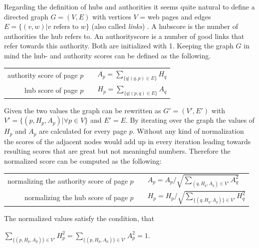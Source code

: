 Regarding the definition of hubs and authorities it seems quite natural to define a directed graph $G=(V,E)$ with vertices $V$ = web pages and edges $E = \{(v,w) | v \textrm{ refers to }w\}$ (also called \emph{links}) .
A hubscore is the number of authorities the hub refers to. An authorityscore is a number of good links that refer towards this authority. Both are initialized with 1.
Keeping the graph $G$ in mind the hub- and authority scores can be defined as the following. \newline
\begin{center}
  \begin{tabular}{ r c l }
    authority score of page $p$ & & $A_p= \sum\nolimits_{\{ q | (q,p) \in E \} } H_q $ \\
    hub score of page $p$ & & $H_p = \sum\nolimits_{\{ q | (p,q) \in E \} } A_q $ \\
  \end{tabular}
\end{center}
Given the two values the graph can be rewritten as $G'=(V',E')$ with $V'=\{ (p, H_p, A_p)| \forall p\in V\}$ and $E' = E$.
By iterating over the graph the values of $H_p$ and $A_p$ are calculated for every page $p$. Without any kind of normalization the scores of the adjacent nodes would add up in every iteration leading towards resulting scores that are great but not meaningful numbers. Therefore the normalized score can be computed as the following:
\begin{center}
  \begin{tabular}{ r c l }
    normalizing the authority score of page $p$ & & $A_p= A_p/\sqrt{\sum\nolimits_{ (q,H_q,A_q) \in V' } A_q^2}$ \\
    normalizing the hub score of page $p$ & & $H_p = H_p/\sqrt{\sum\nolimits_{\{(q,H_q,A_q) \} \in V'} H_q^2}$ \\
  \end{tabular}
\end{center}
The normalized values satisfy the condition, that \newline 
\begin{center}
	\vspace{-2em}
	$\sum\nolimits_{\{(p,H_p,A_p) \} \in V'} H_p^2 = \sum\nolimits_{\{(p,H_p,A_p) \} \in V'} A_p^2 = 1$.
\end{center}
\newpage

